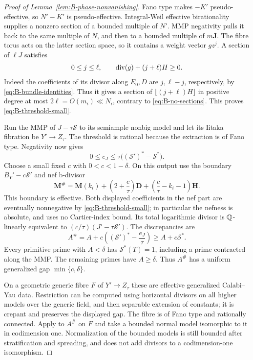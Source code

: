 \begin{proof}[Proof of Lemma~\ref{lem:B-phase-nonvanishing}]
Fano type makes $-K'$ pseudo-effective, so
$N'-K'$ is pseudo-effective.  Integral-Weil effective
birationality \cite[Theorem~1.1]{BirkarPolarised} supplies a
nonzero section of a bounded multiple of $N'$.  MMP negativity
pulls it back to the same multiple of $N$, and then to a bounded
multiple of $m\mathbf J$.
The fibre torus acts on the latter section space, so it contains
a weight vector $gz^j$.  A section of $\ell J$ satisfies
\begin{equation}\label{eq:B-angular-section}
 0\le j\le\ell,
 \qquad \operatorname{div}(g)+(j+\ell)H\ge0.
\end{equation}
Indeed the coefficients of its divisor along $E_0,D$ are
$j,\ell-j$, respectively, by \eqref{eq:B-bundle-identities}.
Thus it gives a section of $\lfloor (j+\ell)H\rfloor$ in positive
degree at most $2\ell=O(m_i)\ll N_i$, contrary to
\eqref{eq:B-no-sections}.  This proves
\eqref{eq:B-threshold-small}.

Run the MMP of $J-\tau\mathcal S$ to its semiample nonbig model
and let its Iitaka fibration be $Y'\to Z_\tau$.  The threshold
is rational because the extraction is of Fano type.  Negativity
now gives
\begin{equation}\label{eq:B-threshold-errors}
 0\le e_J\le\tau\bigl((\mathcal S')^*-\mathcal S^*\bigr).
\end{equation}
Choose a small fixed $c$ with $0<c<1-\delta$.  On this output
use the boundary $B_Y'-c\mathcal S'$ and nef b-divisor
\begin{equation}\label{eq:B-threshold-nef-part}
 \mathbf M^\#
 =\mathbf M(k_i)+
 \left(2+\frac c\tau\right)\mathbf D+
 \left(\frac c\tau-k_i-1\right)\mathbf H.
\end{equation}
This boundary is effective.  Both displayed coefficients in the
nef part are eventually nonnegative by
\eqref{eq:B-threshold-small}; in particular the nefness is
absolute, and uses no Cartier-index bound.  Its total
logarithmic divisor is $\mathbb Q$-linearly equivalent to
$(c/\tau)(J'-\tau\mathcal S')$.  The discrepancies are
\begin{equation}\label{eq:B-modified-gap}
 A^\#=A+c\left((\mathcal S')^*-\frac{e_J}{\tau}\right)
 \ge A+c\mathcal S^*.
\end{equation}
Every primitive prime with $A<\delta$ has $\mathcal S^*(T)=1$,
including a prime contracted along the MMP.  The remaining
primes have $A\ge\delta$.  Thus $A^\#$ has a uniform generalized
gap $\min\{c,\delta\}$.

On a geometric generic fibre $F$ of $Y'\to Z_\tau$ these are
effective generalized Calabi--Yau data.  Restriction can be
computed using horizontal divisors on all higher models over
the generic field, and then separable extension of constants;
it is crepant and preserves the displayed gap.  The fibre is
of Fano type and rationally connected.  Apply
\cite[Theorem~1.7]{BirkarCY} to $A^\#$ on $F$ and take a bounded
normal model isomorphic to it in codimension one.  Normalization
of the bounded models is still bounded after stratification and
spreading, and does not add divisors to a codimension-one
isomorphism.


\end{proof}
